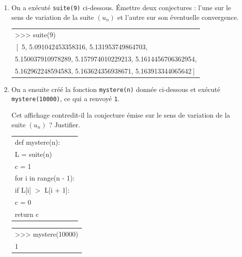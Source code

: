 \begin{enumerate}
		\item On a exécuté \texttt{suite(9)} ci-dessous. Émettre deux conjectures : l'une sur le sens de variation de la suite $(u_{n})$ et l'autre sur son éventuelle convergence.

\begin{center}
\begin{ttfamily}
\begin{tabularx}{\linewidth}{|X|}\hline
>{}>{}>{} suite(9) \\
$\left[\right.$ 5, 5.091042453358316, 5.131953749864703,\\
5.150037910978289, 5.157974010229213, 5.1614456706362954,\\
5.162962248594583, 5.163624356938671, 5.163913344065642$\left.\right]$\\ \hline
\end{tabularx}
\end{ttfamily}
\end{center}

		\item On a ensuite créé la fonction \texttt{mystere(n)} donnée ci-dessous et exécuté \linebreak \texttt{mystere(10000)}, ce qui a renvoyé \texttt{1}.

		Cet affichage contredit-il la conjecture émise sur le sens de variation de la suite $(u_{n})$ ? Justifier.

\begin{center}
		\begin{ttfamily}
\begin{tabularx}{\linewidth}{|X|}\hline
			def mystere(n):\\
			\quad L = suite(n)\\
			\quad	c = 1\\
			\quad	for i in range(n - 1):\\
			\qquad	if L[i] $>$ L[i + 1]:\\
			\qquad \quad c = 0\\
			\quad return c\\ \hline
\end{tabularx}
		\end{ttfamily}
		\end{center}

		\begin{center}
		\begin{ttfamily}
\begin{tabularx}{\linewidth}{|X|}\hline
		>{}>{}>{} mystere(10000)\\
		1\\ \hline
\end{tabularx}
		\end{ttfamily}
		\end{center}
	\end{enumerate}

